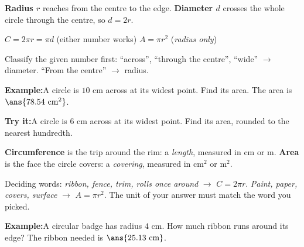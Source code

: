 \documentclass[12pt]{article}
\begin{document}


\begin{formulabox}
\textbf{Radius $r$} reaches from the centre to the edge. \textbf{Diameter $d$}
crosses the whole circle through the centre, so $d = 2r$.\par
\smallskip
$C = 2\pi r = \pi d$ \quad (either number works) \qquad
$A = \pi r^2$ \quad (\emph{radius only})\par
\smallskip
Classify the given number first: ``across'', ``through the centre'',
``wide'' $\rightarrow$ diameter. ``From the centre'' $\rightarrow$ radius.
\end{formulabox}

\begin{examplebox}
\textbf{Example:}\quad A circle is $10$ cm across at its widest point. Find its
area.
The area is $\ans{78.54\ \text{cm}^2}$.
\end{examplebox}

\begin{tryitbox}
\textbf{Try it:}\quad A circle is $6$ cm across at its widest point. Find its
area, rounded to the nearest hundredth.\\[2pt]
\end{tryitbox}


\begin{formulabox}
\textbf{Circumference} is the trip around the rim: a \emph{length}, measured in
cm or m. \textbf{Area} is the face the circle covers: a \emph{covering},
measured in cm$^2$ or m$^2$.\par
\smallskip
Deciding words: \emph{ribbon, fence, trim, rolls once around} $\rightarrow$
$C = 2\pi r$. \emph{Paint, paper, covers, surface} $\rightarrow$ $A = \pi r^2$.
The unit of your answer must match the word you picked.
\end{formulabox}

\begin{examplebox}
\textbf{Example:}\quad A circular badge has radius $4$ cm. How much ribbon runs
around its edge?
The ribbon needed is $\ans{25.13\ \text{cm}}$.
\end{examplebox}
\end{document}
